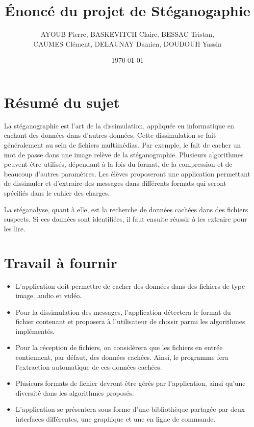\documentclass[11pt]{article}
\title{Énoncé du projet de Stéganogaphie}
\author{AYOUB Pierre, BASKEVITCH Claire, BESSAC Tristan, \\
CAUMES Clément, DELAUNAY Damien, DOUDOUH Yassin}
\date\today
\begin{document}
\maketitle

\section{Résumé du sujet}

La stéganographie est l'art de la dissimulation, appliquée en informatique en
cachant des données dans d'autres données. Cette dissimulation se fait
généralement au sein de fichiers multimédias. Par exemple, le fait de cacher un
mot de passe dans une image relève de la stéganographie. Plusieurs algorithmes
peuvent être utilisés, dépendant à la fois du format, de la compression et de
beaucoup d'autres paramètres. Les élèves proposeront une application permettant
de dissimuler et d'extraire des messages dans différents formats qui seront
spécifiés dans le cahier des charges.

La stéganalyse, quant à elle, est la recherche de données cachées dans des
fichiers suspects. Si ces données sont identifiées, il faut ensuite réussir à
les extraire pour les lire.

\section{Travail à fournir}

\begin{itemize}
    \item L'application doit permettre de cacher des données dans des fichiers
        de type image, audio et vidéo.
    \item Pour la dissimulation des messages, l'application détectera le format
        du fichier contenant et proposera à l'utilisateur de choisir parmi les
        algorithmes implémentés. 
    \item Pour la réception de fichiers, on considèrera que les fichiers en
        entrée contiennent, par défaut, des données cachées. Ainsi, le
        programme fera l'extraction automatique de ces données cachées.
    \item Plusieurs formats de fichier devront être gérés par l'application,
        ainsi qu'une diversité dans les algorithmes proposés.
    \item L'application se présentera sous forme d'une bibliothèque partagée par
        deux interfaces différentes, une graphique et une en ligne de commande.
\end{itemize}
\end{document}
